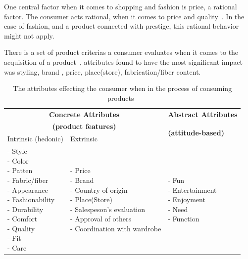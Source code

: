 One central factor when it comes to shopping and fashion is price, a rational factor.
The consumer acts rational, when it comes to price and quality~\cite{Hanf1994}.
In the case of fashion, and a product connected with prestige, this rational behavior might not apply.

There is a set of product criterias a consumer evaluates when it comes to the acquisition of a product~\cite{dutton2006}, attributes found to have the most significant impact was styling, brand , price, place(store), fabrication/fiber content.

\begin{table}[H]
    \centering
    \begin{tabular}{l|l|l}
      \multicolumn{2}{c|}{\textbf{Concrete Attributes}} & \textbf{Abstract Attributes} \\
      \multicolumn{2}{c|}{\textbf{(product features)}} & \multirow{2}{*}{\textbf{(attitude-based)}} \\ \cline{1-2}
      Intrinsic (hedonic)   & Extrinsic & \\ \hline
      \pbox{4cm}{
          - Style \\
          - Color \\
          - Patten \\
          - Fabric/fiber \\
          - Appearance \\
          - Fashionability \\
          - Durability \\
          - Comfort \\
          - Quality \\
          - Fit \\
          - Care \\
      } & \pbox{6cm}{
          - Price \\
          - Brand \\
          - Country of origin \\
          - Place(Store) \\
          - Salespeson's evaluation \\
          - Approval of others \\
          - Coordination with wardrobe \\
      } & \pbox{4cm}{
          - Fun \\
          - Entertainment \\
          - Enjoyment \\
          - Need \\
          - Function \\
        } \\ \hline
    \end{tabular}
    \label{table:ConsumersPurchaseDec}
    \caption [Consumers' Purchase Decisions]{The attributes effecting the consumer when in the process of consuming products~\cite{dutton2006}}
\end{table}

